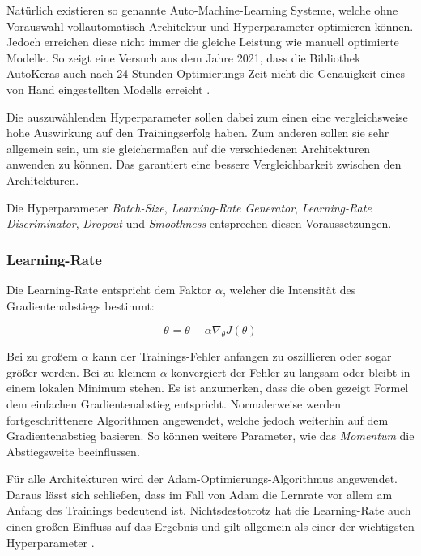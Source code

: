 Natürlich existieren so genannte Auto-Machine-Learning Systeme, welche ohne Vorauswahl vollautomatisch Architektur und Hyperparameter optimieren können. 
Jedoch erreichen diese nicht immer die gleiche Leistung wie manuell optimierte Modelle.
So zeigt eine Versuch aus dem Jahre 2021, dass die Bibliothek AutoKeras \cite{auto-keras} auch nach 24 Stunden Optimierungs-Zeit nicht die Genauigkeit eines von Hand eingestellten Modells erreicht \cite[S. 2036]{dl-framework-evaluation}.
\newline

Die auszuwählenden Hyperparameter sollen dabei zum einen eine vergleichsweise hohe Auswirkung auf den Trainingserfolg haben.
Zum anderen sollen sie sehr allgemein sein, um sie gleichermaßen auf die verschiedenen Architekturen anwenden zu können.
Das garantiert eine bessere Vergleichbarkeit zwischen den Architekturen.
\newline

Die Hyperparameter \textit{Batch-Size}, \textit{Learning-Rate Generator}, \textit{Learning-Rate Discriminator}, \textit{Dropout} und \textit{Smoothness} entsprechen diesen Voraussetzungen.

\subsubsection{Learning-Rate}
Die Learning-Rate entspricht dem Faktor \(\alpha\), welcher die Intensität des Gradientenabstiegs bestimmt:  

\[\theta_{}  =  \theta_{}  - \alpha   \nabla_{ \theta }  J( \theta )  \]

Bei zu großem \(\alpha\) kann der Trainings-Fehler anfangen zu oszillieren oder sogar größer werden.
Bei zu kleinem \(\alpha\) konvergiert der Fehler zu langsam oder bleibt in einem lokalen Minimum stehen. 
Es ist anzumerken, dass die oben gezeigt Formel dem einfachen Gradientenabstieg entspricht.
Normalerweise werden fortgeschrittenere Algorithmen angewendet, welche jedoch weiterhin auf dem Gradientenabstieg basieren.
So können weitere Parameter, wie das \textit{Momentum} die Abstiegsweite beeinflussen.
\newline

Für alle Architekturen wird der Adam-Optimierungs-Algorithmus angewendet.
Daraus lässt sich schließen, dass im Fall von Adam die Lernrate vor allem am Anfang des Trainings bedeutend ist.
Nichtsdestotrotz hat die Learning-Rate auch einen großen Einfluss auf das Ergebnis und gilt allgemein als einer der wichtigsten Hyperparameter \cite[S. 447]{learning-rate-most-important}. 
\newline

